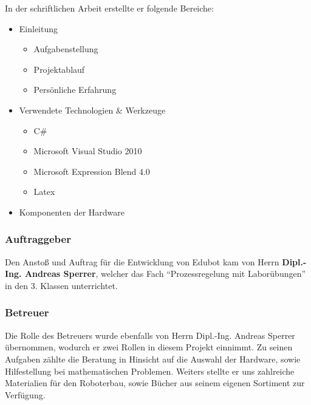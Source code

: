 \begin{itemize}
In der schriftlichen Arbeit erstellte er folgende Bereiche:
\begin{itemize}
\item Einleitung
\begin{itemize}
\item Aufgabenstellung
\item Projektablauf
\item Persönliche Erfahrung
\end{itemize}
\item Verwendete Technologien \& Werkzeuge
\begin{itemize}
\item C\#
\item Microsoft Visual Studio 2010
\item Microsoft Expression Blend 4.0
\item Latex
\end{itemize}
\item Komponenten der Hardware
\end{itemize}
     

\end{itemize}
   
\subsubsection{Auftraggeber}
Den Anstoß und Auftrag für die Entwicklung von Edubot kam von Herrn \textbf{Dipl.-Ing. Andreas Sperrer}, welcher das Fach “Prozessregelung mit Laborübungen” in den 3. Klassen unterrichtet.

\subsubsection{Betreuer}
Die Rolle des Betreuers wurde ebenfalls von Herrn Dipl.-Ing. Andreas Sperrer übernommen, wodurch er zwei Rollen in diesem Projekt einnimmt. Zu seinen Aufgaben zählte die Beratung in Hinsicht auf die Auswahl der Hardware, sowie Hilfestellung bei mathematischen Problemen. Weiters stellte er uns zahlreiche Materialien für den Roboterbau, sowie Bücher aus seinem eigenen Sortiment zur Verfügung.

